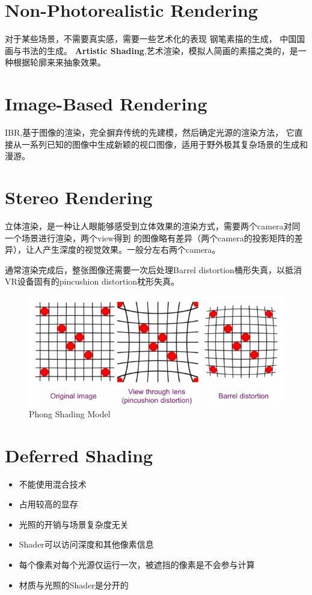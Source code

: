 \section{Non-Photorealistic Rendering}
对于某些场景，不需要真实感，需要一些艺术化的表现
钢笔素描的生成，
中国国画与书法的生成。
\newline
\textbf{Artistic Shading},艺术渲染，模拟人简画的素描之类的，是一种根据轮廓来来抽象效果。

\section{Image-Based Rendering}

IBR,基于图像的渲染，完全摒弃传统的先建模，然后确定光源的渲染方法，
它直接从一系列已知的图像中生成新颖的视口图像，适用于野外极其复杂场景的生成和漫游。

\section{Stereo Rendering}
立体渲染，是一种让人眼能够感受到立体效果的渲染方式，需要两个camera对同一个场景进行渲染，两个view得到
的图像略有差异（两个camera的投影矩阵的差异），让人产生深度的视觉效果。一般分左右两个camera。

通常渲染完成后，整张图像还需要一次后处理Barrel distortion桶形失真，以抵消VR设备固有的pincushion distortion枕形失真。
\begin{figure}[h]
    \centering
    \includegraphics[width=\textwidth]{images/Optimising-OpenGL-ES-for-mobile-VR-lens-distortion.png}
    \caption{Phong Shading Model}
\end{figure}


\section{Deferred Shading}

\begin{itemize}    
    \item {不能使用混合技术}
    \item {占用较高的显存}
    \item {光照的开销与场景复杂度无关}
    \item {Shader可以访问深度和其他像素信息}
    \item {每个像素对每个光源仅运行一次，被遮挡的像素是不会参与计算}
    \item {材质与光照的Shader是分开的}
\end{itemize}


